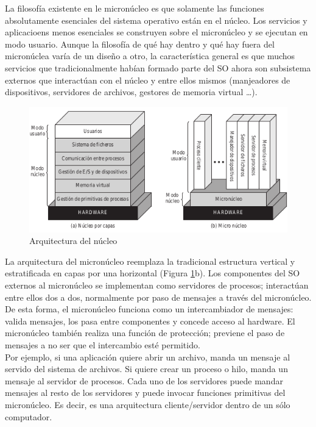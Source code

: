 \documentclass{article}
\begin{document}
				La filosofía existente en le micronúcleo es que solamente las funciones absolutamente esenciales del sistema operativo están en el núcleo. Los servicios y aplicacioens menos esenciales se construyen sobre el micronúcleo y se ejecutan en modo usuario. Aunque la filosofía de qué hay dentro y qué hay fuera del micronúclea varía de un diseño a otro, la característica general es que muchos servicios que tradicionalmente habían formado parte del SO ahora son subsistema externos que interactúan con el núcleo y entre ellos mismos (manjeadores de dispositivos, servidores de archivos, gestores de memoria virtual \ldots). \\
				
				\begin{figure}
				\caption{Arquitectura del núcleo}
				\label{figura27:arquitecturanucleo}
				\centering
				\includegraphics[width=1.1\textwidth, scale=1]{figura27.png}
				\end{figure}
				
				La arquitectura del micronúcleo reemplaza la tradicional estructura vertical y estratificada en capas por una horizontal (Figura \ref{figura27:arquitecturanucleo}b). Los componentes del SO externos al micronúcleo se implementan como servidores de procesos; interactúan entre ellos dos a dos, normalmente por paso de mensajes a través del micronúcleo. De esta forma, el micronúcleo funciona como un intercambiador de mensajes: valida mensajes, los pasa entre componentes y concede acceso al hardware. El micronúcleo también realiza una función de protección; previene el paso de mensajes a no ser que el intercambio esté permitido. \\
				
				Por ejemplo, si una aplicación quiere abrir un archivo, manda un mensaje al servido del sistema de archivos. Si quiere crear un proceso o hilo, manda un mensaje al servidor de procesos. Cada uno de los servidores puede mandar mensajes al resto de los servidores y puede invocar funciones primitivas del micronúcleo. Es decir, es una arquitectura cliente/servidor dentro de un sólo computador.
			
\end{document}
